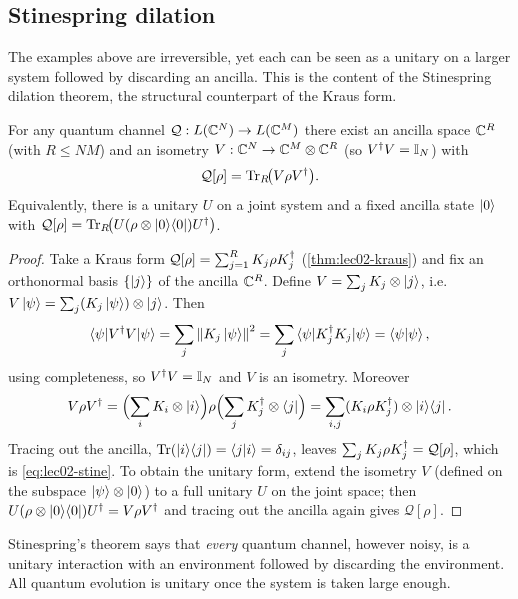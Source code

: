 \subsection{Stinespring dilation}

The examples above are irreversible, yet each can be seen as a unitary on a larger
system followed by discarding an ancilla. This is the content of the Stinespring
dilation theorem, the structural counterpart of the Kraus form.

\begin{theorem}\label{thm:lec02-stinespring}
For any quantum channel $\mathcal{Q}:L(\mathbb{C}^{N})\to L(\mathbb{C}^{M})$ there exist an
ancilla space $\mathbb{C}^{R}$ (with $R\le NM$) and an isometry $V:\mathbb{C}^{N}\to\mathbb{C}^{M}\otimes\mathbb{C}^{R}$
(so $V^{\dagger} V=\mathbb{I}_N$) with
\begin{equation}\label{eq:lec02-stine}
  \mathcal{Q}[\rho]=\operatorname{Tr}_R\!\bigl(V\rho V^{\dagger}\bigr).
\end{equation}
Equivalently, there is a unitary $U$ on a joint system and a fixed ancilla state
$\ket{0}$ with $\mathcal{Q}[\rho]=\operatorname{Tr}_R\!\bigl(U(\rho\otimes\ket{0}\!\bra{0})U^{\dagger}\bigr)$.
\end{theorem}

\begin{proof}
Take a Kraus form $\mathcal{Q}[\rho]=\sum_{j=1}^{R}K_j\rho K_j^{\dagger}$
(\cref{thm:lec02-kraus}) and fix an orthonormal basis $\{\ket{j}\}$ of the ancilla
$\mathbb{C}^{R}$. Define $V=\sum_j K_j\otimes\ket{j}$, i.e.
$V\ket{\psi}=\sum_j (K_j\ket{\psi})\otimes\ket{j}$. Then
\[
  \braket{\psi|V^{\dagger} V|\psi}
   =\sum_j\left\lVert K_j\ket{\psi} \right\rVert^{2}
   =\sum_j\braket{\psi|K_j^{\dagger} K_j|\psi}
   =\braket{\psi|\psi},
\]
using completeness, so $V^{\dagger} V=\mathbb{I}_N$ and $V$ is an isometry. Moreover
\[
  V\rho V^{\dagger}=\Bigl(\sum_i K_i\otimes\ket{i}\Bigr)\rho\Bigl(\sum_j K_j^{\dagger}\otimes\bra{j}\Bigr)
   =\sum_{i,j}(K_i\rho K_j^{\dagger})\otimes\ket{i}\!\bra{j}.
\]
Tracing out the ancilla, $\operatorname{Tr}(\ket{i}\!\bra{j})=\braket{j|i}=\delta_{ij}$, leaves
$\sum_j K_j\rho K_j^{\dagger}=\mathcal{Q}[\rho]$, which is \eqref{eq:lec02-stine}. To
obtain the unitary form, extend the isometry $V$ (defined on the subspace
$\ket{\psi}\otimes\ket{0}$) to a full unitary $U$ on the joint space; then
$U(\rho\otimes\ket{0}\!\bra{0})U^{\dagger}=V\rho V^{\dagger}$ and tracing out the ancilla again gives
$\mathcal{Q}[\rho]$.
\end{proof}

Stinespring's theorem says that \emph{every} quantum channel, however noisy, is a
unitary interaction with an environment followed by discarding the environment.
All quantum evolution is unitary once the system is taken large enough.

